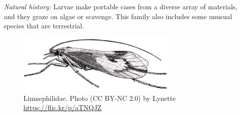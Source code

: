 \documentclass[letterpaper, 11pt]{article}
\begin{document}
\noindent{}\textit{Natural history:} Larvae make portable cases from a diverse array of materials, and they graze on algae or scavenge. This family also includes some unusual species that are terrestrial. \\


\begin{figure}[ht!]
  \centering
    \includegraphics[width=0.7\textwidth]{TrichoImage02}
  \caption{Limnephilidae. Photo (CC BY-NC 2.0) by Lynette \url{https://flic.kr/p/aTNQJZ}}
  \label{fig:phryg}
\end{figure}



\end{document}
